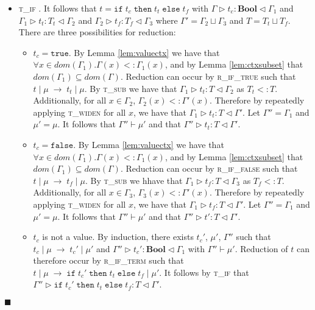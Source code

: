 \documentclass[preprint]{sigplanconf}
\newcommand{\lemref}[1]{Lemma \ref{#1}}
\newcommand{\rifexpr}{\textsc{r\_if\_term} }
\newcommand{\riftrue}{\textsc{r\_if\_true} }
\newcommand{\riffalse}{\textsc{r\_if\_false} }
\newcommand{\tif}{\textsc{t\_if} }
\newcommand{\tsub}{\textsc{t\_sub} }
\newcommand{\twiden}{\textsc{t\_widen} }
\newcommand{\typerule}[4]{#1 \triangleright #2 : #3 \triangleleft #4}
\newcommand{\oprule}[4]{#1 \mid #2\;\longrightarrow\;#3 \mid #4}
\newcommand{\truev}{\mathtt{true}}
\newcommand{\falsev}{\mathtt{false}}
\newcommand{\boolt}{\mathbf{Bool}}
\newcommand{\ift}[3]{\mathtt{if} \; #1 \; \mathtt{then} \; #2 \; \mathtt{else} \; #3}
\newcommand{\qed}{$\blacksquare$}
\newenvironment{proof}{\vspace{1ex}\noindent{\bf Proof}\hspace{0.5em}}
  {\hfill\qed\vspace{1ex}}
\begin{document}
\begin{proof}
\begin{itemize}
Let $\Gamma'' = \Gamma'$. By the appropriate value typing rule for $v$, 
it follows that $\typerule{\Gamma''}{v}{T'}{\Gamma'}$.
By application of rule \tsub, it follows that
$\typerule{\Gamma''}{v}{T}{\Gamma'}$.
Additionally, it follows that
$\Gamma'' \vdash \mu'$, as $O'@S_n <: O@\overline{S'}$.

\item \tif. It follows that $t = \ift{t_c}{t_t}{t_f}$ with
$\typerule{\Gamma}{t_c}{\boolt}{\Gamma_1}$ and
$\typerule{\Gamma_1}{t_t}{T_t}{\Gamma_2}$ and
$\typerule{\Gamma_2}{t_f}{T_f}{\Gamma_3}$ where
$\Gamma' = \Gamma_2 \sqcup \Gamma_3$ and $T = T_t \sqcup T_f$. There are
three possibilities for reduction:

  \begin{itemize}
  \item $t_c = \truev$. By \lemref{lem:valuectx} we have that
  $\forall x \in dom(\Gamma_1) . \Gamma(x) <: \Gamma_1(x)$, and
  by \lemref{lem:ctxsubset} that $dom(\Gamma_1) \subseteq dom(\Gamma)$. 
  Reduction can occur by \riftrue such that
  $\oprule{t}{\mu}{t_t}{\mu}$. By \tsub we have that
  $\typerule{\Gamma_1}{t_t}{T}{\Gamma_2}$ as $T_t <: T$. Additionally, for
  all $x \in \Gamma_2$, $\Gamma_2(x) <: \Gamma'(x)$. Therefore by
  repeatedly applying \twiden for all $x$, we have that
  $\typerule{\Gamma_1}{t_t}{T}{\Gamma'}$.
  Let $\Gamma'' = \Gamma_1$ and $\mu' = \mu$.
  It follows that $\Gamma'' \vdash \mu'$
  and that $\typerule{\Gamma''}{t_t}{T}{\Gamma'}$.

  \item $t_c = \falsev$. By \lemref{lem:valuectx} we have that
  $\forall x \in dom(\Gamma_1) . \Gamma(x) <: \Gamma_1(x)$, and
  by \lemref{lem:ctxsubset} that $dom(\Gamma_1) \subseteq dom(\Gamma)$.
  Reduction can occur by \riffalse such that
  $\oprule{t}{\mu}{t_f}{\mu}$. By \tsub we hhave that
  $\typerule{\Gamma_1}{t_f}{T}{\Gamma_3}$ as $T_f <: T$. Additionally, for
  all $x \in \Gamma_3$, $\Gamma_3(x) <: \Gamma'(x)$. Therefore by
  repeatedly applying \twiden for all $x$, we have that
  $\typerule{\Gamma_1}{t_f}{T}{\Gamma'}$. Let $\Gamma'' = \Gamma_1$
  and $\mu' = \mu$. It follows that $\Gamma'' \vdash \mu'$ and that
  $\typerule{\Gamma''}{t'}{T}{\Gamma'}$.

  \item $t_c$ is not a value. By induction, there exists $t_c'$,
  $\mu'$, $\Gamma''$ such that 
  $\oprule{t_c}{\mu}{t_c'}{\mu'}$ and 
  $\typerule{\Gamma''}{t_c'}{\boolt}{\Gamma_1}$ with $\Gamma'' \vdash \mu'$. 
  Reduction of $t$ can therefore occur by \rifexpr such that
  $\oprule{t}{\mu}{\ift{t_c'}{t_t}{t_f}}{\mu'}$. It follows
  by \tif that $\typerule{\Gamma''}{\ift{t_c'}{t_t}{t_f}}{T}{\Gamma'}$.
  \end{itemize}


\end{itemize}
\end{proof}
\end{document}
